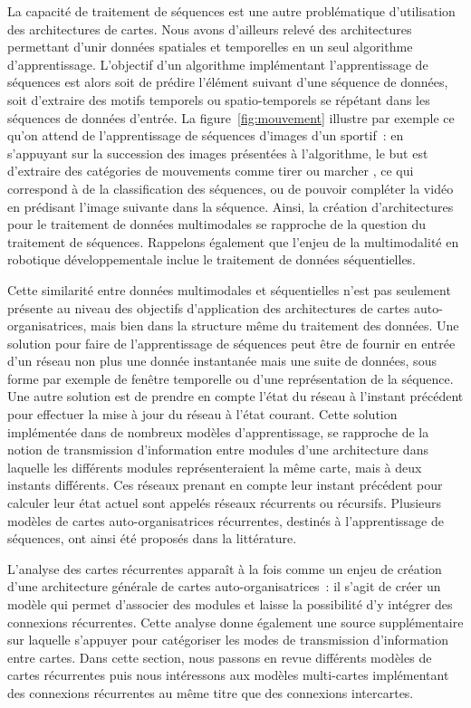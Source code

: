 \documentclass[../main]{subfiles}
\begin{document}
La capacité de traitement de séquences est une autre problématique d'utilisation des architectures de cartes. Nous avons d'ailleurs relevé des architectures permettant d'unir données spatiales et temporelles en un seul algorithme d'apprentissage. L'objectif d'un algorithme implémentant l'apprentissage de séquences est alors soit de prédire l'élément suivant d'une séquence de données, soit d'extraire des motifs temporels ou spatio-temporels se répétant dans les séquences de données d'entrée. 
La figure~\ref{fig:mouvement} illustre par exemple ce qu'on attend de l'apprentissage de séquences d'images d'un sportif~: en s'appuyant sur la succession des images présentées à l'algorithme, le but est d'extraire des catégories de mouvements comme \og tirer \fg{} ou \og marcher \fg{}, ce qui correspond à de la classification des séquences, ou de pouvoir compléter la vidéo en prédisant l'image suivante dans la séquence.
Ainsi, la création d'architectures pour le traitement de données multimodales se rapproche de la question du traitement de séquences. Rappelons également que l'enjeu de la multimodalité en robotique développementale inclue le traitement de données séquentielles.

Cette similarité entre données multimodales et séquentielles n'est pas seulement présente au niveau des objectifs d'application des architectures de cartes auto-organisatrices, mais bien dans la structure même du traitement des données. 
Une solution pour faire de l'apprentissage de séquences peut être de fournir en entrée d'un réseau non plus une donnée instantanée mais une suite de données, sous forme par exemple de fenêtre temporelle ou d'une représentation de la séquence.
Une autre solution est de prendre en compte l'état du réseau à l'instant précédent pour effectuer la mise à jour du réseau à l'état courant. 
Cette solution implémentée dans de nombreux modèles d'apprentissage, se rapproche de la notion de transmission d'information entre modules d'une architecture dans laquelle les différents modules représenteraient la même carte, mais à deux instants différents. Ces réseaux prenant en compte leur instant précédent pour calculer leur état actuel sont appelés réseaux récurrents ou récursifs.
Plusieurs modèles de cartes auto-organisatrices récurrentes, destinés à l'apprentissage de séquences, ont ainsi été proposés dans la littérature.

L'analyse des cartes récurrentes apparaît à la fois comme un enjeu de création d'une architecture générale de cartes auto-organisatrices~: il s'agit de créer un modèle qui permet d'associer des modules et laisse la possibilité d'y intégrer des connexions récurrentes.
Cette analyse donne également une source supplémentaire sur laquelle s'appuyer pour catégoriser les modes de transmission d'information entre cartes. Dans cette section, nous passons en revue différents modèles de cartes récurrentes puis nous intéressons aux modèles multi-cartes implémentant des connexions récurrentes au même titre que des connexions intercartes.
\end{document}
